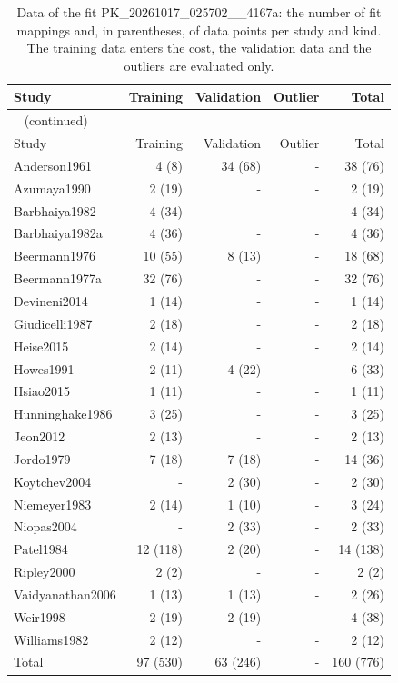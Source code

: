 \begin{longtable}{lrrrr}
\caption{Data of the fit PK\_20261017\_025702\_\_4167a: the number of fit mappings and, in parentheses, of data points per study and kind. The training data enters the cost, the validation data and the outliers are evaluated only.}\label{tab:data:PK_20261017_025702__4167a} \\
\toprule
Study & Training & Validation & Outlier & Total \\
\midrule
\endfirsthead
\multicolumn{5}{l}{\small\tablename~\thetable{} (continued)} \\
\toprule
Study & Training & Validation & Outlier & Total \\
\midrule
\endhead
\bottomrule
\endlastfoot
Anderson1961 & 4 (8) & 34 (68) & - & 38 (76) \\
Azumaya1990 & 2 (19) & - & - & 2 (19) \\
Barbhaiya1982 & 4 (34) & - & - & 4 (34) \\
Barbhaiya1982a & 4 (36) & - & - & 4 (36) \\
Beermann1976 & 10 (55) & 8 (13) & - & 18 (68) \\
Beermann1977a & 32 (76) & - & - & 32 (76) \\
Devineni2014 & 1 (14) & - & - & 1 (14) \\
Giudicelli1987 & 2 (18) & - & - & 2 (18) \\
Heise2015 & 2 (14) & - & - & 2 (14) \\
Howes1991 & 2 (11) & 4 (22) & - & 6 (33) \\
Hsiao2015 & 1 (11) & - & - & 1 (11) \\
Hunninghake1986 & 3 (25) & - & - & 3 (25) \\
Jeon2012 & 2 (13) & - & - & 2 (13) \\
Jordo1979 & 7 (18) & 7 (18) & - & 14 (36) \\
Koytchev2004 & - & 2 (30) & - & 2 (30) \\
Niemeyer1983 & 2 (14) & 1 (10) & - & 3 (24) \\
Niopas2004 & - & 2 (33) & - & 2 (33) \\
Patel1984 & 12 (118) & 2 (20) & - & 14 (138) \\
Ripley2000 & 2 (2) & - & - & 2 (2) \\
Vaidyanathan2006 & 1 (13) & 1 (13) & - & 2 (26) \\
Weir1998 & 2 (19) & 2 (19) & - & 4 (38) \\
Williams1982 & 2 (12) & - & - & 2 (12) \\
Total & 97 (530) & 63 (246) & - & 160 (776) \\
\end{longtable}


